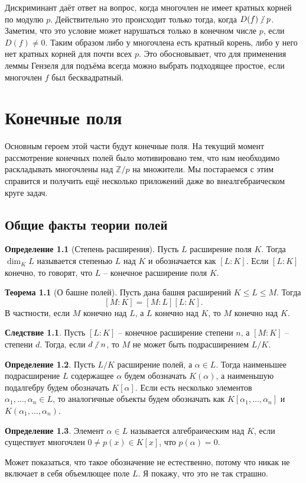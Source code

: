 \documentclass[10pt,a4paper,oneside]{book}
\theoremstyle{definition}
\newtheorem*{defn}{{\color{yellow!30!red} Определение}}
\newtheorem{thm}{{\color{red!40!black} Теорема}}
\newtheorem{cor}{Следствие}
\newcommand{\mb}[1]{\mathbb{#1}}
\newcommand{\ndi}{\mathop{\not\scalebox{0.85}{\raisebox{-1.2pt}[0.5\height]{\vdots}}\,}}
\def\thrm{\begin{thm}}
\def\ethrm{\end{thm}}
\def\dfn{\begin{defn}}
\def\edfn{\end{defn}}
\def\crl{\begin{cor}}
\def\ecrl{\end{cor}}
\begin{document}
Дискриминант даёт ответ на вопрос, когда многочлен не имеет кратных корней по модулю $p$. Действительно это происходит только тогда, когда $D(f)\ndi p$. Заметим, что это условие может нарушаться только в конечном числе $p$, если $D(f)\neq 0$. Таким образом либо у многочлена есть кратный корень, либо у него нет кратных корней для почти всех $p$. Это обосновывает, что для применения леммы Гензеля для подъёма всегда можно выбрать подходящее простое, если многочлен $f$ был бесквадратный.



\chapter{Конечные поля}
Основным героем этой части будут конечные поля. На текущий момент рассмотрение конечных полей было мотивировано тем, что нам необходимо раскладывать многочлены над $\mb Z/p$ на множители. Мы постараемся с этим справится и получить ещё несколько приложений даже во внеалгебраическом круге задач.


\section{Общие факты теории полей}
\dfn[Степень расширения] Пусть $L$ расширение поля $K$. Тогда $\dim_K L$ называется степенью $L$ над $K$ и обозначается как $[L: K]$. Если $[L: K]$ конечно, то говорят, что $L$ -- конечное расширение поля $K$. 
\edfn

\thrm[О башне полей] Пусть дана башня расширений $K\leq L \leq M$. Тогда 
$$[M: K]=[M: L][L: K].$$
В частности, если $M$ конечно над $L$, а $L$ конечно над $K$, то $M$ конечно над $K$.
\ethrm

\crl Пусть $[L: K]$ -- конечное расширение степени $n$, а $[M:K]$ -- степени $d$. Тогда, если $d \ndi n$, то $M$ не может быть подрасширением $L/K$.
\ecrl

\dfn Пусть $L/K$ расширение полей, а $\alpha \in L$. Тогда наименьшее подрасширение $L$ содержащее $\alpha$ будем обозначать $K(\alpha)$, а наименьшую подалгебру будем обозначать $K[\alpha]$. Если есть несколько элементов $\alpha_1,\dots,\alpha_n\in L$, то аналогичные объекты будем обозначать как $K[\alpha_1,\dots,\alpha_n]$ и $K(\alpha_1,\dots,\alpha_n)$.
\edfn

\dfn Элемент $\alpha \in L$ называется алгебраическим над $K$, если существует многочлен $0\neq p(x)\in K[x]$, что $p(\alpha)=0$. 
\edfn

Может показаться, что такое обозначение не естественно, потому что никак не включает в себя объемлющее поле $L$. Я покажу, что это не так страшно.
\end{document}
